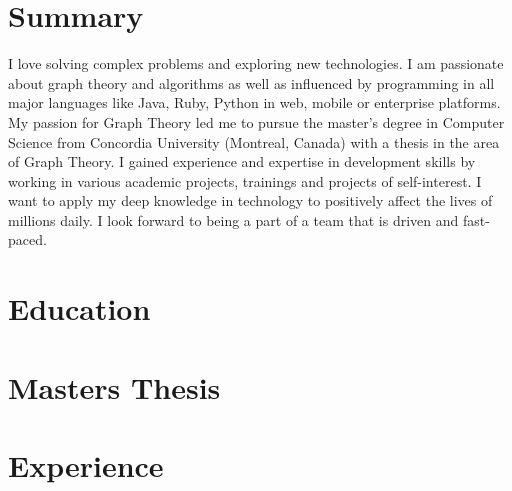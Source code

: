 \documentclass[11pt,a4paper,sans]{moderncv} %
\begin{document}
\makecvtitle %
\section{Summary}
I love solving complex problems and exploring new technologies. I am passionate about graph theory and algorithms as well as influenced by programming in all major languages like Java, Ruby, Python in web, mobile or enterprise platforms. My passion for Graph Theory led me to pursue the master's degree in Computer Science from Concordia University (Montreal, Canada) with a thesis in the area of Graph Theory. I gained experience and expertise in development skills by working in various academic projects, trainings and projects of self-interest. I want to apply my deep knowledge in technology to positively affect the lives of millions daily. I look forward to being a part of a team that is driven and fast-paced.


\section{Education}


\section{Masters Thesis}



\section{Experience}
\end{document}
